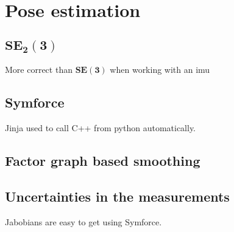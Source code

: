 \chapter{Pose estimation}

\section{$\mathbf{SE_2(3)}$}
More correct than $\mathbf{SE(3)}$ when working with an \gls{imu}

\section{Symforce}
Jinja used to call C++ from python automatically.

\section{Factor graph based smoothing}

\section{Uncertainties in the measurements}
Jabobians are easy to get using Symforce.

